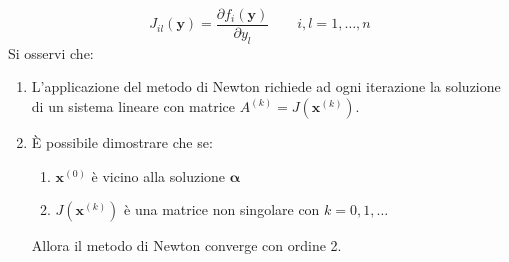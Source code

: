 \begin{equation*}
	J_{il}\left(\mathbf{y}\right) = \dfrac{\partial f_{i}\left(\mathbf{y}\right)}{\partial y_{l}} \hspace{2em} i,l = 1, \dots, n
\end{equation*}
Si osservi che:
\begin{enumerate}
	\item L'applicazione del metodo di Newton richiede ad ogni iterazione la soluzione di un sistema lineare con matrice $A^{\left(k\right)} = J\left(\mathbf{x}^{\left(k\right)}\right)$.
	
	\item È possibile dimostrare che se:
	\begin{enumerate}
		\item $\mathbf{x}^{\left(0\right)}$ è  vicino alla soluzione $\mathbf{\alpha}$
		
		\item $J\left(\mathbf{x}^{\left(k\right)}\right)$ è una matrice non singolare con $k = 0, 1, \dots$
	\end{enumerate}
	 Allora il metodo di Newton converge con ordine 2.
\end{enumerate}

\newpage

